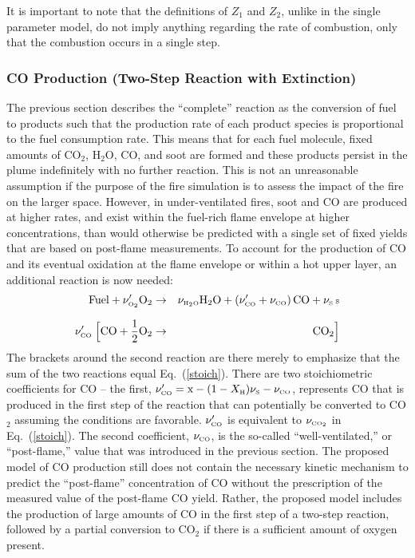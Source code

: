 \documentclass[11pt]{book}
\begin{document}
It is important to note that the definitions of $Z_1$ and $Z_2$, unlike in the single parameter model,
do not imply anything regarding the rate of combustion, only that the combustion occurs in a single step.


\subsubsection{CO Production (Two-Step Reaction with Extinction)}

\label{co_production}

The previous section describes the ``complete'' reaction as the conversion of fuel to
products such that the production rate of each product species is proportional to the fuel consumption rate.
This means that for each fuel molecule, fixed amounts of CO$_2$, H$_2$O, CO, and soot are formed and these products
persist in the plume indefinitely with no further reaction. This is not an unreasonable assumption if
the purpose of the fire simulation is to assess the impact of the fire on the larger space.
However, in under-ventilated fires, soot and CO are produced at higher rates,
and exist within the fuel-rich flame envelope at higher concentrations,
than would otherwise be predicted with a single set of fixed yields that are based on post-flame measurements. To account for the
production of CO and its eventual oxidation at the flame envelope or within a hot upper layer,
an additional reaction is now needed:
\begin{eqnarray}
\hbox{Fuel} +  \nu_{\tiny \hbox{O}_2}' \mathrm{O_2}  &\rightarrow&  \nu_{\tiny \hbox{H}_2\hbox{O}} \mathrm{H_2O} + (\nu_{\tiny \hbox{CO}}'+ \nu_{\tiny \hbox{CO}}) \, \mathrm{CO} +
     \nu_{\tiny \hbox{S}} \, \mathrm{{\tiny \hbox{S}}}  \\*[.1in]
\nu_{\tiny \hbox{CO}}' \; \Big[ \mathrm{CO} + \frac{1}{2} \mathrm{O_2}  &\rightarrow&  \mathrm{CO_2}  \Big]
\label{3reac} \end{eqnarray}
The brackets around the second reaction are there merely to emphasize that the sum of the two reactions equal Eq.~(\ref{stoich}).
There are two stoichiometric coefficients for CO -- the first, $\nu_{\tiny \hbox{CO}}'=\hbox{x}-(1-X_{\tiny \hbox{H}}) \nu_{\tiny \hbox{S}}-\nu_{\tiny \hbox{CO}}$,
represents CO that is produced in the first
step of the reaction that can potentially be converted to CO$_2$ assuming the conditions are favorable. $\nu_{\tiny \hbox{CO}}'$ is equivalent to $\nu_{\tiny \hbox{CO}_2}$ in
Eq.~(\ref{stoich}). The second coefficient, $\nu_{\tiny \hbox{CO}}$,
is the so-called ``well-ventilated,'' or ``post-flame,'' value that was introduced in the previous section. The proposed model of CO production
still does not contain the necessary kinetic mechanism to predict the ``post-flame'' concentration of CO without the prescription of the
measured value of the post-flame CO yield. Rather, the proposed model includes the production of large amounts of CO in the first step of a two-step
reaction, followed by a partial conversion to CO$_2$ if there is a sufficient amount of oxygen present.
\end{document}
